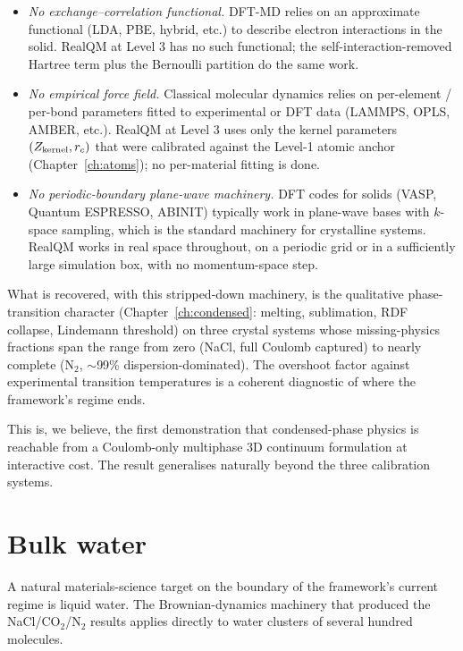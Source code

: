 \begin{itemize}
\item \emph{No exchange--correlation functional.} DFT-MD relies on an approximate functional (LDA, PBE, hybrid, etc.) to describe electron interactions in the solid. RealQM at Level 3 has no such functional; the self-interaction-removed Hartree term plus the Bernoulli partition do the same work.
\item \emph{No empirical force field.} Classical molecular dynamics relies on per-element / per-bond parameters fitted to experimental or DFT data (LAMMPS, OPLS, AMBER, etc.). RealQM at Level 3 uses only the kernel parameters $(Z_{\rm kernel}, r_c)$ that were calibrated against the Level-1 atomic anchor (Chapter~\ref{ch:atoms}); no per-material fitting is done.
\item \emph{No periodic-boundary plane-wave machinery.} DFT codes for solids (VASP, Quantum ESPRESSO, ABINIT) typically work in plane-wave bases with $k$-space sampling, which is the standard machinery for crystalline systems. RealQM works in real space throughout, on a periodic grid or in a sufficiently large simulation box, with no momentum-space step.
\end{itemize}

What is recovered, with this stripped-down machinery, is the qualitative phase-transition character (Chapter~\ref{ch:condensed}: melting, sublimation, RDF collapse, Lindemann threshold) on three crystal systems whose missing-physics fractions span the range from zero (NaCl, full Coulomb captured) to nearly complete (N$_2$, $\sim$99\% dispersion-dominated). The overshoot factor against experimental transition temperatures is a coherent diagnostic of where the framework's regime ends.

This is, we believe, the first demonstration that condensed-phase physics is reachable from a Coulomb-only multiphase 3D continuum formulation at interactive cost. The result generalises naturally beyond the three calibration systems.

\section{Bulk water}\label{sec:bulk-water-materials}

A natural materials-science target on the boundary of the framework's current regime is liquid water. The Brownian-dynamics machinery that produced the NaCl/CO$_2$/N$_2$ results applies directly to water clusters of several hundred molecules.

